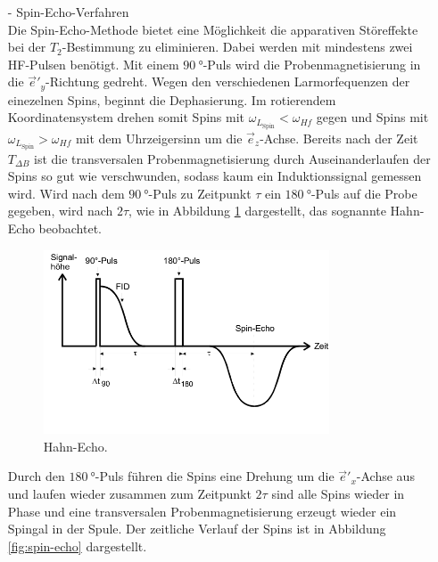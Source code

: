 \begin{itemize}
  \item[-] Spin-Echo-Verfahren\\
  Die Spin-Echo-Methode bietet eine Möglichkeit die apparativen Störeffekte
  bei der $T_2$-Bestimmung zu eliminieren.
  Dabei werden mit mindestens zwei HF-Pulsen benötigt.
  Mit einem $\SI{90}{\degree}$-Puls wird die Probenmagnetisierung in die
$\vec{e}'_y$-Richtung gedreht.
Wegen den verschiedenen Larmorfequenzen der einezelnen Spins, beginnt die Dephasierung.
Im rotierendem Koordinatensystem drehen somit Spins mit $\omega_{L_\text{Spin}}<\omega_{Hf}$
gegen und Spins mit $\omega_{L_\text{Spin}}>\omega_{Hf}$ mit dem
Uhrzeigersinn um die $\vec{e}_z$-Achse.
Bereits nach der Zeit $T_{\Delta B}$ ist die transversalen
Probenmagnetisierung durch
Auseinanderlaufen der Spins so gut wie verschwunden,
sodass kaum ein Induktionssignal
gemessen wird. Wird nach dem $\SI{90}{\degree}$-Puls
zu Zeitpunkt $\tau$
ein $\SI{180}{\degree}$-Puls
auf die Probe gegeben, wird nach $2\tau$, wie in Abbildung \ref{fig:hahn-echo} dargestellt, das sognannte Hahn-Echo beobachtet.
\begin{figure}
  \includegraphics[width=0.8\textwidth]{hahn-echo.PNG}
  \caption{Hahn-Echo.\cite{sample}}
  \label{fig:hahn-echo}
\end{figure}
Durch den $\SI{180}{\degree}$-Puls führen
die Spins eine Drehung um die
$\vec{e}'_x$-Achse aus und laufen wieder zusammen
zum Zeitpunkt $2\tau$ sind alle Spins wieder in Phase und eine
transversalen Probenmagnetisierung
erzeugt wieder ein Spingal in der Spule.
Der zeitliche Verlauf der Spins ist in Abbildung
\ref{fig:spin-echo} dargestellt.


\end{itemize}
